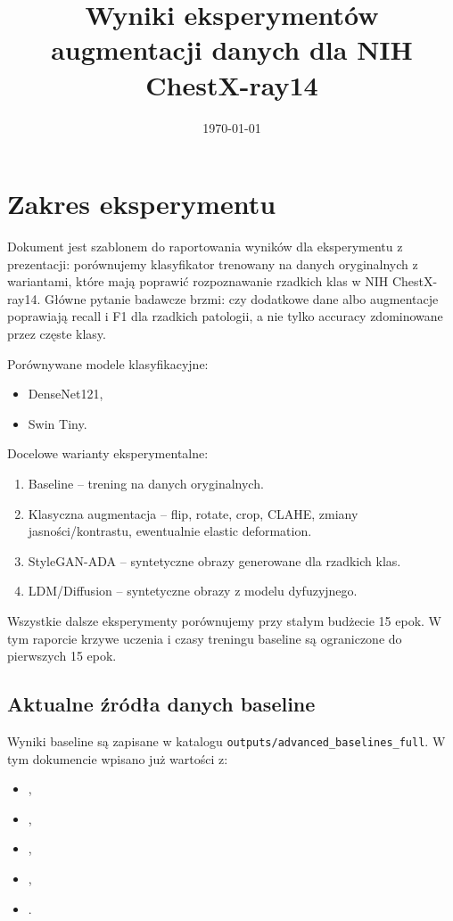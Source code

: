 \documentclass[11pt,a4paper]{article}
\title{Wyniki eksperymentów augmentacji danych dla NIH ChestX-ray14}
\author{}
\date{\today}
\newcommand{\baselinepathtext}{\texttt{outputs/advanced\_baselines\_full}}
\begin{document}
\maketitle

\section{Zakres eksperymentu}

Dokument jest szablonem do raportowania wyników dla eksperymentu z prezentacji:
porównujemy klasyfikator trenowany na danych oryginalnych z wariantami, które mają poprawić
rozpoznawanie rzadkich klas w NIH ChestX-ray14. Główne pytanie badawcze brzmi:
czy dodatkowe dane albo augmentacje poprawiają recall i F1 dla rzadkich patologii,
a nie tylko accuracy zdominowane przez częste klasy.

Porównywane modele klasyfikacyjne:
\begin{itemize}
  \item DenseNet121,
  \item Swin Tiny.
\end{itemize}

Docelowe warianty eksperymentalne:
\begin{enumerate}
  \item Baseline -- trening na danych oryginalnych.
  \item Klasyczna augmentacja -- flip, rotate, crop, CLAHE, zmiany jasności/kontrastu, ewentualnie elastic deformation.
  \item StyleGAN-ADA -- syntetyczne obrazy generowane dla rzadkich klas.
  \item LDM/Diffusion -- syntetyczne obrazy z modelu dyfuzyjnego.
\end{enumerate}

Wszystkie dalsze eksperymenty porównujemy przy stałym budżecie 15 epok. W tym raporcie krzywe
uczenia i czasy treningu baseline są ograniczone do pierwszych 15 epok.

\subsection{Aktualne źródła danych baseline}

Wyniki baseline są zapisane w katalogu \baselinepathtext. W tym dokumencie wpisano już wartości z:
\begin{itemize}
  \item {},
  \item {},
  \item {},
  \item {},
  \item {}.
\end{itemize}
\end{document}
